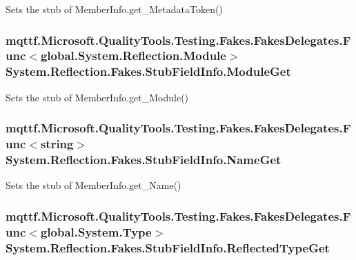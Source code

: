 Sets the stub of Member\-Info.\-get\-\_\-\-Metadata\-Token()

\hypertarget{class_system_1_1_reflection_1_1_fakes_1_1_stub_field_info_a847a9c1647e6df9a170f1a11ce8de220}{
\subsubsection[{Module\-Get}]{\setlength{\rightskip}{0pt plus 5cm}mqttf.\-Microsoft.\-Quality\-Tools.\-Testing.\-Fakes.\-Fakes\-Delegates.\-Func$<$global.\-System.\-Reflection.\-Module$>$ System.\-Reflection.\-Fakes.\-Stub\-Field\-Info.\-Module\-Get}}\label{class_system_1_1_reflection_1_1_fakes_1_1_stub_field_info_a847a9c1647e6df9a170f1a11ce8de220}


Sets the stub of Member\-Info.\-get\-\_\-\-Module()

\hypertarget{class_system_1_1_reflection_1_1_fakes_1_1_stub_field_info_a296af9a50bacc115083b64e6d0facf2b}{
\subsubsection[{Name\-Get}]{\setlength{\rightskip}{0pt plus 5cm}mqttf.\-Microsoft.\-Quality\-Tools.\-Testing.\-Fakes.\-Fakes\-Delegates.\-Func$<$string$>$ System.\-Reflection.\-Fakes.\-Stub\-Field\-Info.\-Name\-Get}}\label{class_system_1_1_reflection_1_1_fakes_1_1_stub_field_info_a296af9a50bacc115083b64e6d0facf2b}


Sets the stub of Member\-Info.\-get\-\_\-\-Name()

\hypertarget{class_system_1_1_reflection_1_1_fakes_1_1_stub_field_info_a5a94d8e16d2f1b5ca4df41e8aec63f27}{
\subsubsection[{Reflected\-Type\-Get}]{\setlength{\rightskip}{0pt plus 5cm}mqttf.\-Microsoft.\-Quality\-Tools.\-Testing.\-Fakes.\-Fakes\-Delegates.\-Func$<$global.\-System.\-Type$>$ System.\-Reflection.\-Fakes.\-Stub\-Field\-Info.\-Reflected\-Type\-Get}}\label{class_system_1_1_reflection_1_1_fakes_1_1_stub_field_info_a5a94d8e16d2f1b5ca4df41e8aec63f27}


